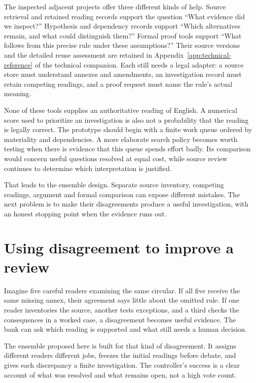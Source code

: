 \documentclass[12pt,a4paper,oneside,openany]{book}
\begin{document}
The inspected adjacent projects offer three different kinds of help. Source
retrieval and retained reading records support the question ``What evidence did
we inspect?'' Hypothesis and dependency records support ``Which alternatives
remain, and what could distinguish them?'' Formal proof tools support ``What
follows from this precise rule under these assumptions?'' Their source versions
and the detailed reuse assessment are retained in
Appendix~\ref{app:technical-reference} of the technical companion. Each still needs a legal adapter: a
source store must understand annexes and amendments, an investigation record must
retain competing readings, and a proof request must name the rule's actual
meaning.

None of these tools supplies an authoritative reading of English. A numerical
score used to prioritize an investigation is also not a probability that the
reading is legally correct. The prototype should begin with a finite work queue
ordered by materiality and dependencies. A more elaborate search policy becomes
worth testing when there is evidence that this queue spends effort badly. Its
comparison would concern useful questions resolved at equal cost, while source
review continues to determine which interpretation is justified.

That leads to the ensemble design. Separate source inventory, competing readings,
argument and formal comparison can expose different mistakes. The next problem
is to make their disagreements produce a useful investigation, with an honest
stopping point when the evidence runs out.

\chapter{Using disagreement to improve a review}
\label{ch:ensemble}

Imagine five careful readers examining the same circular. If all five receive
the same missing annex, their agreement says little about the omitted rule. If
one reader inventories the source, another tests exceptions, and a third checks
the consequences in a worked case, a disagreement becomes useful evidence. The
bank can ask which reading is supported and what still needs a human decision.

The ensemble proposed here is built for that kind of disagreement. It assigns
different readers different jobs, freezes the initial readings before debate,
and gives each discrepancy a finite investigation. The controller's success is
a clear account of what was resolved and what remains open, not a high vote
count.
\end{document}
